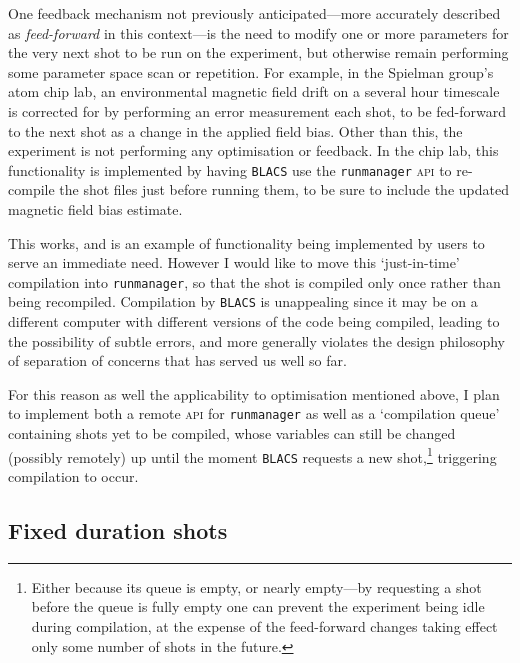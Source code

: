 One feedback mechanism not previously anticipated---more accurately described as \emph{feed-forward} in this context---is the need to modify one or more parameters for the very next shot to be run on the experiment, but otherwise remain performing some parameter space scan or repetition. For example, in the Spielman group's atom chip lab, an environmental magnetic field drift on a several hour timescale is corrected for by performing an error measurement each shot, to be fed-forward to the next shot as a change in the applied field bias. Other than this, the experiment is not performing any optimisation or feedback. In the chip lab, this functionality is implemented by having \texttt{BLACS} use the \texttt{runmanager} \textsc{api} to re-compile the shot files just before running them, to be sure to include the updated magnetic field bias estimate. 

This works, and is an example of functionality being implemented by users to serve an immediate need. However I would like to move this `just-in-time' compilation into \texttt{runmanager}, so that the shot is compiled only once rather than being recompiled. Compilation by \texttt{BLACS} is unappealing since it may be on a different computer with different versions of the code being compiled, leading to the possibility of subtle errors, and more generally violates the design philosophy of separation of concerns that has served us well so far. 

For this reason as well the applicability to optimisation mentioned above, I plan to implement both a remote \textsc{api} for \texttt{runmanager} as well as a `compilation queue' containing shots yet to be compiled, whose variables can still be changed (possibly remotely) up until the moment \texttt{BLACS} requests a new shot,\footnote{Either because its queue is empty, or nearly empty---by requesting a shot before the queue is fully empty one can prevent the experiment being idle during compilation, at the expense of the feed-forward changes taking effect only some number of shots in the future.} triggering compilation to occur.

\subsection{Fixed duration shots}

